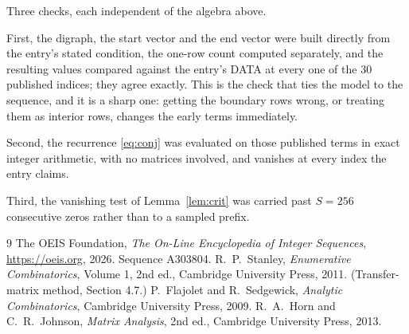 \documentclass[11pt,a4paper]{article}
\theoremstyle{plain}
\theoremstyle{definition}
\begin{document}
Three checks, each independent of the algebra above.

First, the digraph, the start vector and the end vector were built directly from the
entry's stated condition, the one-row count computed separately, and the resulting values
compared against the entry's DATA at every one of the $30$ published indices; they
agree exactly. This is the check that ties the model to the sequence, and it is a sharp one:
getting the boundary rows wrong, or treating them as interior rows, changes the early terms
immediately.

Second, the recurrence \eqref{eq:conj} was evaluated on those published terms in exact
integer arithmetic, with no matrices involved, and vanishes at every index the entry claims.

Third, the vanishing test of Lemma~\ref{lem:crit} was carried past $S=256$ consecutive
zeros rather than to a sampled prefix.

\begin{thebibliography}{9}
 The OEIS Foundation, \emph{The On-Line Encyclopedia of Integer
Sequences}, \url{https://oeis.org}, 2026. Sequence A303804.
 R.~P.~Stanley, \emph{Enumerative Combinatorics}, Volume 1, 2nd ed.,
Cambridge University Press, 2011. (Transfer-matrix method, Section 4.7.)
 P.~Flajolet and R.~Sedgewick, \emph{Analytic Combinatorics}, Cambridge
University Press, 2009.
 R.~A.~Horn and C.~R.~Johnson, \emph{Matrix Analysis}, 2nd ed., Cambridge
University Press, 2013.
\end{thebibliography}
\end{document}
